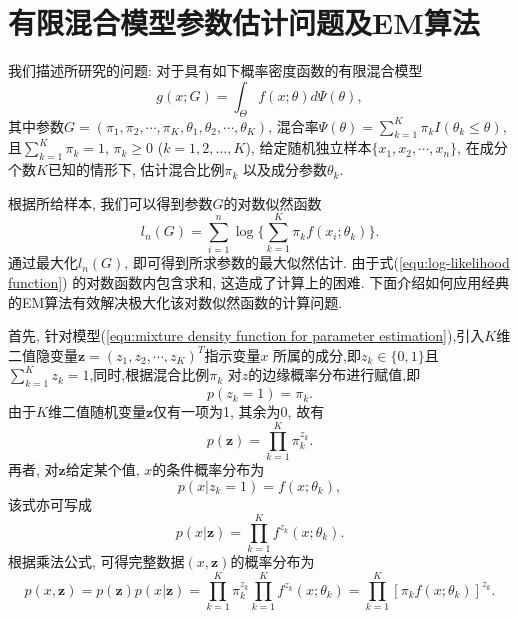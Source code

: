 \documentclass[a4paper,12pt,openany,oneside,utf-8]{ctexbook}
\begin{document}
\section{有限混合模型参数估计问题及EM算法}
\label{sec:Classical EM algorithm for parameter estimation in finite mixture models}
我们描述所研究的问题: 对于具有如下概率密度函数的有限混合模型
\begin{equation}
\label{equ:mixture density function for parameter estimation}
  g(x; G)=\int_{\Theta}f(x; \theta)d\Psi(\theta),
\end{equation}
其中参数$G=(\pi_{1}, \pi_{2}, \cdots, \pi_{K}, \theta_{1}, \theta_{2}, \cdots, \theta_{K})$, 混合率$\Psi(\theta)=\sum_{k=1}^{K}\pi_{k}I(\theta_{k}\leq\theta)$, 且$\sum_{k=1}^{K}\pi_{k}=1$, $\pi_{k}\geq0$ ($k=1, 2, \ldots, K$), 给定随机独立样本$\{x_1, x_2, \cdots, x_n\}$, 在成分个数$K$已知的情形下, 估计混合比例$\pi_{k}$ 以及成分参数$\theta_{k}$.

根据所给样本, 我们可以得到参数$G$的对数似然函数
\begin{equation}
\label{equ:log-likelihood function}
  l_{n}(G)=\sum_{i=1}^{n}\log\{\sum_{k=1}^{K}\pi_{k}f(x_{i}; \theta_{k})\}.
\end{equation}
通过最大化$l_{n}(G)$, 即可得到所求参数的最大似然估计. 由于式(\ref{equ:log-likelihood function}) 的对数函数内包含求和, 这造成了计算上的困难. 下面介绍如何应用经典的EM算法有效解决极大化该对数似然函数的计算问题.

首先, 针对模型(\ref{equ:mixture density function for parameter estimation}),引入$K$维二值隐变量$\bm{z} = (z_1, z_2, \cdots, z_K)^T$指示变量$x$ 所属的成分,即$z_k \in \{ 0, 1 \}$且$\sum_{k=1}^{K}z_{k}=1$,同时,根据混合比例$\pi_k$ 对$z$的边缘概率分布进行赋值,即
\begin{equation}
\label{equ:the marginal distribution over z}
  p(z_k = 1)=\pi_{k}.
\end{equation}
由于$K$维二值随机变量$\bm{z}$仅有一项为1, 其余为0, 故有
\begin{equation}
\label{equ:another form of the marginal distribution over z}
  p(\bm{z})=\prod_{k=1}^{K}\pi_k^{z_k}.
\end{equation}
再者, 对$\bm{z}$给定某个值, $x$的条件概率分布为
\begin{equation}
\label{equ:the conditional distribution of x given a particular value for z}
  p(x | z_k = 1) = f(x; \theta_{k}),
\end{equation}
该式亦可写成
\begin{equation}
\label{equ:another form of the conditional distribution of x given a particular value for z}
  p(x | \bm{z}) = \prod_{k=1}^{K} f^{z_k}(x; \theta_{k}).
\end{equation}
根据乘法公式, 可得完整数据$(x, \bm{z})$的概率分布为
\begin{equation}
\label{equ:the probability distribution of complete data (x, z)}
  p(x, \bm{z}) = p(\bm{z}) p(x | \bm{z}) = \prod_{k=1}^{K}\pi_k^{z_k} \prod_{k=1}^{K} f^{z_k}(x; \theta_{k}) = \prod_{k=1}^{K}[\pi_k f(x; \theta_{k})]^{z_k}.
\end{equation}
\end{document}
